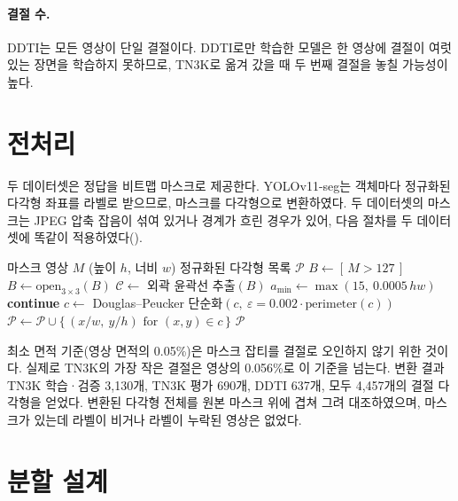 \paragraph{결절 수.} DDTI는 모든 영상이 단일 결절이다. DDTI로만 학습한 모델은 한 영상에 결절이 여럿 있는
장면을 학습하지 못하므로, TN3K로 옮겨 갔을 때 두 번째 결절을 놓칠 가능성이 높다.

\section{전처리}\label{sec:ds_preproc}

두 데이터셋은 정답을 비트맵 마스크로 제공한다. YOLOv11-seg는 객체마다 정규화된 다각형 좌표를 라벨로
받으므로, 마스크를 다각형으로 변환하였다. 두 데이터셋의 마스크는 JPEG 압축 잡음이 섞여 있거나
경계가 흐린 경우가 있어, 다음 절차를 두 데이터셋에 똑같이 적용하였다().

\begin{algorithm}[htbp]
\caption{정답 마스크의 YOLO-seg 다각형 변환}\label{alg:mask2poly}
\begin{algorithmic}[1]
\Require 마스크 영상 $M$ (높이 $h$, 너비 $w$)
\Ensure 정규화된 다각형 목록 $\mathcal{P}$
\State $B \gets [\,M > 127\,]$ 
\State $B \gets \mathrm{open}_{3\times3}(B)$ 
\State $\mathcal{C} \gets$ 외곽 윤곽선 추출$(B)$ 
\State $a_{\min} \gets \max(15,\ 0.0005\,hw)$
   \textbf{continue} \EndIf
  \State $c \gets$ Douglas--Peucker 단순화$(c,\ \varepsilon = 0.002 \cdot \mathrm{perimeter}(c))$
   $\mathcal{P} \gets \mathcal{P} \cup \{\, (x/w,\ y/h) \text{ for } (x,y) \in c \,\}$ \EndIf
\EndFor
\State \Return $\mathcal{P}$ 
\end{algorithmic}
\end{algorithm}

최소 면적 기준(영상 면적의 0.05\%)은 마스크 잡티를 결절로 오인하지 않기 위한 것이다. 실제로 TN3K의 가장
작은 결절은 영상의 0.056\%로 이 기준을 넘는다. 변환 결과 TN3K 학습·검증 3,130개, TN3K 평가 690개,
DDTI 637개, 모두 4,457개의 결절 다각형을 얻었다. 변환된 다각형 전체를 원본 마스크 위에 겹쳐 그려
대조하였으며, 마스크가 있는데 라벨이 비거나 라벨이 누락된 영상은 없었다.

\section{분할 설계}\label{sec:ds_split}

